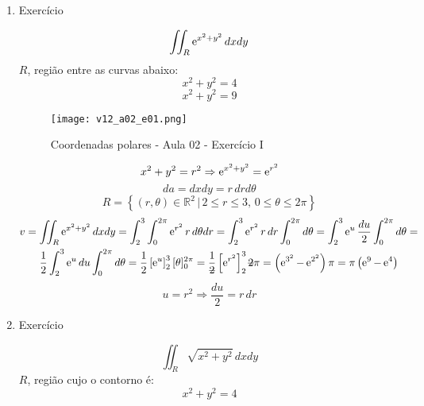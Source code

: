 \begin{enumerate}
	\item Exercício
	
	\begin{equation*}
		\iint_R \operatorname{e}^{x^2 + y^2} dx dy
	\end{equation*}
	$R$, região entre as curvas abaixo:
	\begin{equation*}
		x^2 + y^2 = 4
	\end{equation*}
	\begin{equation*}
		x^2 + y^2 = 9
	\end{equation*}
	
	\begin{figure}[htb]
		\caption{Coordenadas polares - Aula 02 - Exercício I}
		\label{v12_a02_e01}
		\centering
		\texttt{[image: v12\_a02\_e01.png]}		
	\end{figure}
	
	\begin{equation*}
		x^2 + y^2 = r^2\Rightarrow	\operatorname{e}^{x^2 + y^2} = \operatorname{e}^{r^2}
	\end{equation*}
	\begin{equation*}
		da = dx dy = r\, dr d\theta
	\end{equation*}
	\begin{equation*}
		R = \left\{(r, \theta) \in \mathbb{R}^2 \,|\, 2 \leq r \leq 3,\, 0 \leq \theta \leq 2\pi\right\}
	\end{equation*}		
	\begin{gather*}
		v = \iint_R \e^{x^2 + y^2} dx dy = \int_2^3 \int_0^{2\pi} \e^{r^2} r\, d\theta dr = \int_2^3 \e^{r^2} r\, dr \int_0^{2\pi} d\theta = \int_2^3 \e^u \dfrac{du}{2} \int_0^{2\pi} d\theta =\\ \dfrac{1}{2}\int_2^3 \e^u du \int_0^{2\pi} d\theta = \dfrac{1}{2} \left[\e^u\right]_2^3 [\theta]_0^{2\pi} = \dfrac{1}{\overstrike{2}} \left[\e^{r^2}\right]_2^3 \overstrike{2}\pi = \left(\e^{3^2} - \e^{2^2}\right) \pi = \pi\left(\e^9 - \e^4\right)	
	\end{gather*}
	\begin{equation*}
		u = r^2 \Rightarrow \dfrac{du}{2} = r\, dr
	\end{equation*}
	
	\item Exercício
	
	\begin{equation*}
		\iint_R \sqrt{x^2 + y^2}\, dxdy
	\end{equation*}
	$R$, região cujo o contorno é:
	\begin{equation*}
		x^2 + y^2 = 4
	\end{equation*}
	

\end{enumerate}
